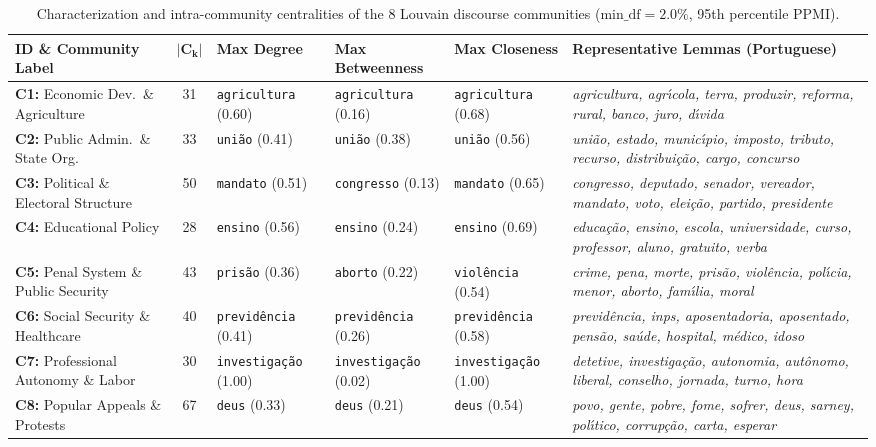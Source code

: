 \documentclass[pdflatex,sn-mathphys,iicol]{sn-jnl}
\begin{document}
\begin{table}[t]
\caption{Characterization and intra-community centralities of the 8 Louvain discourse communities ($\text{min\_df}=2.0\%$, 95th percentile PPMI).}\label{tab:communities}
\footnotesize
\setlength{\tabcolsep}{5pt}
\renewcommand{\arraystretch}{1.25}
\begin{tabularx}{\textwidth}{@{}>{\raggedright\arraybackslash}p{3.6cm} c >{\raggedright\arraybackslash}p{2.3cm} >{\raggedright\arraybackslash}p{2.3cm} >{\raggedright\arraybackslash}p{2.3cm} X@{}}
\toprule
\textbf{ID \& Community Label} & $\boldsymbol{|C_k|}$ & \textbf{Max Degree} & \textbf{Max Betweenness} & \textbf{Max Closeness} & \textbf{Representative Lemmas (Portuguese)} \\
\midrule
\textbf{C1:} Economic Dev.\ \& Agriculture & 31 & \texttt{agricultura} (0.60) & \texttt{agricultura} (0.16) & \texttt{agricultura} (0.68) & \textit{agricultura, agr\'{\i}cola, terra, produzir, reforma, rural, banco, juro, d\'{\i}vida} \\
\textbf{C2:} Public Admin.\ \& State Org. & 33 & \texttt{uni\~{a}o} (0.41) & \texttt{uni\~{a}o} (0.38) & \texttt{uni\~{a}o} (0.56) & \textit{uni\~{a}o, estado, munic\'{\i}pio, imposto, tributo, recurso, distribui\c{c}\~{a}o, cargo, concurso} \\
\textbf{C3:} Political \& Electoral Structure & 50 & \texttt{mandato} (0.51) & \texttt{congresso} (0.13) & \texttt{mandato} (0.65) & \textit{congresso, deputado, senador, vereador, mandato, voto, elei\c{c}\~{a}o, partido, presidente} \\
\textbf{C4:} Educational Policy & 28 & \texttt{ensino} (0.56) & \texttt{ensino} (0.24) & \texttt{ensino} (0.69) & \textit{educa\c{c}\~{a}o, ensino, escola, universidade, curso, professor, aluno, gratuito, verba} \\
\textbf{C5:} Penal System \& Public Security & 43 & \texttt{pris\~{a}o} (0.36) & \texttt{aborto} (0.22) & \texttt{viol\^{e}ncia} (0.54) & \textit{crime, pena, morte, pris\~{a}o, viol\^{e}ncia, pol\'{\i}cia, menor, aborto, fam\'{\i}lia, moral} \\
\textbf{C6:} Social Security \& Healthcare & 40 & \texttt{previd\^{e}ncia} (0.41) & \texttt{previd\^{e}ncia} (0.26) & \texttt{previd\^{e}ncia} (0.58) & \textit{previd\^{e}ncia, inps, aposentadoria, aposentado, pens\~{a}o, sa\'{u}de, hospital, m\'{e}dico, idoso} \\
\textbf{C7:} Professional Autonomy \& Labor & 30 & \texttt{investiga\c{c}\~{a}o} (1.00) & \texttt{investiga\c{c}\~{a}o} (0.02) & \texttt{investiga\c{c}\~{a}o} (1.00) & \textit{detetive, investiga\c{c}\~{a}o, autonomia, aut\^{o}nomo, liberal, conselho, jornada, turno, hora} \\
\textbf{C8:} Popular Appeals \& Protests & 67 & \texttt{deus} (0.33) & \texttt{deus} (0.21) & \texttt{deus} (0.54) & \textit{povo, gente, pobre, fome, sofrer, deus, sarney, pol\'{\i}tico, corrup\c{c}\~{a}o, carta, esperar} \\
\bottomrule
\end{tabularx}
\end{table}
\end{document}

